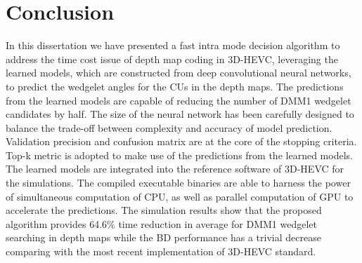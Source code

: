 \chapter{Conclusion}\label{ch:chapter6} %
%
%
In this dissertation we have presented a fast
intra mode decision algorithm to
address the time cost issue of depth map coding
in 3D-HEVC, leveraging 
the learned models, which are constructed from deep
convolutional neural networks, to predict the wedgelet angles
for the CUs in the depth maps.
The predictions from the learned models are capable of
reducing the number of DMM1 wedgelet candidates by half.
The size of the neural network has been carefully designed to balance
the trade-off between complexity and accuracy of model prediction.
Validation precision and confusion matrix are 
at the core of the stopping criteria.
Top-k metric is adopted to make use of the predictions
from the learned models.
The learned models are integrated into the reference software of
3D-HEVC for the simulations.
The compiled executable binaries are able to harness
the power of simultaneous computation of CPU, as well as
parallel computation of GPU to accelerate the 
predictions.
The simulation results show that the proposed algorithm
provides 64.6\% time reduction in average 
for DMM1 wedgelet searching
in depth maps while the
BD performance has a trivial decrease comparing 
with the most recent implementation of 3D-HEVC
standard.
